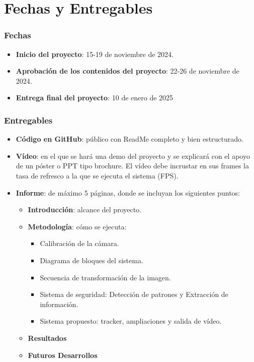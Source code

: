 \chapter{\textbf{Fechas y Entregables}}
\label{chapter:fechas_entregables}

\subsection*{Fechas}
{}
\vspace{5mm}

\begin{itemize}
    \item \textbf{Inicio del proyecto}: 15-19 de noviembre de 2024.
    \item \textbf{Aprobación de los contenidos del proyecto}: 22-26 de noviembre de 2024.
    \item \textbf{Entrega final del proyecto}: 10 de enero de 2025
\end{itemize}

\subsection*{Entregables}
{}
\vspace{5mm}

\begin{itemize}
    \item \textbf{Código en GitHub}: público con ReadMe completo y bien estructurado.
    \item \textbf{Vídeo}: en el que se hará una demo del proyecto y se explicará con el apoyo de un póster o PPT tipo brochure. El vídeo debe incrustar en sus frames la tasa de refresco a la que se ejecuta el sistema (FPS).
    \item \textbf{Informe}: de máximo 5 páginas, donde se incluyan los siguientes puntos:
    \begin{itemize}
        \item \textbf{Introducción}: alcance del proyecto.
        \item \textbf{Metodología}: cómo se ejecuta:
        \begin{itemize}
            \item Calibración de la cámara.
            \item Diagrama de bloques del sistema.
            \item Secuencia de transformación de la imagen.
            \item Sistema de seguridad: Detección de patrones y Extracción de información.
            \item Sistema propuesto: tracker, ampliaciones y salida de vídeo.
        \end{itemize}
        \item \textbf{Resultados}
        \item \textbf{Futuros Desarrollos}
    \end{itemize}
\end{itemize}
